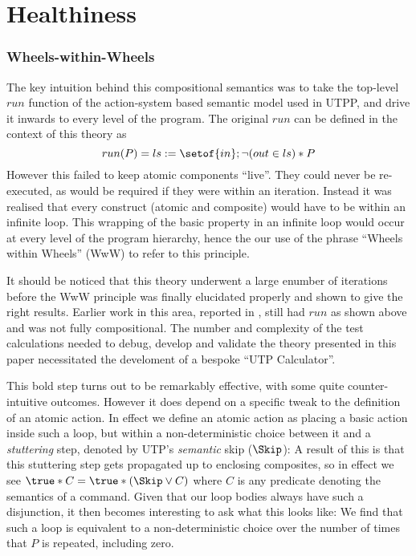 \section{Healthiness}\label{sec:health}


\subsubsection{Wheels-within-Wheels}\label{ssec:WwW}

The key intuition behind this compositional semantics was to take the
top-level $run$ function of the action-system based semantic model used in UTPP,
and drive it inwards to every level of the program.
The original $run$ can be defined in the context of this theory as
\[
  run(P) = ls := \setof{in} ; \lnot (out \in ls) * P
\]
However this failed to keep atomic components ``live''.
They could never be re-executed,
as would be required if they were within an iteration.
Instead it was realised that every construct (atomic and composite)
would have to be within an infinite loop.%
%
This wrapping of the basic property in an infinite loop
would occur at every level of the program hierarchy,
hence the our use of the phrase ``Wheels within Wheels''
(WwW) to refer to this principle.

It should be noticed that this theory underwent
a large enumber of iterations before the WwW principle was finally
elucidated properly and shown to give the right results.
Earlier work in this area, reported in \cite{conf/tase/BMN16},
still had $run$ as shown above and was not fully compositional.
The number and complexity of the test calculations needed to debug,
develop and validate the theory presented in this paper
necessitated the develoment of a bespoke ``UTP Calculator''\cite{DBLP:conf/utp/Butterfield16}.

This bold step turns out to be remarkably effective,
with some quite counter-intuitive outcomes.
However it does depend on a specific tweak to the
definition of an atomic action.
In effect we define an atomic action
as placing a basic action inside such a loop,
but within a non-deterministic choice between it
and a \emph{stuttering} step, denoted by UTP's \emph{semantic} skip ($\Skip$):
A result of this is that this stuttering step gets
propagated up to enclosing composites,
so in effect we see $\true * C = \true * (\Skip\lor C)$
where $C$ is any predicate denoting the semantics of a command.
Given that our loop bodies always have such a disjunction,
it then becomes interesting to ask what this looks like:
We find that such a loop is equivalent to a non-deterministic
choice over the number of times that $P$ is repeated,
including zero.


